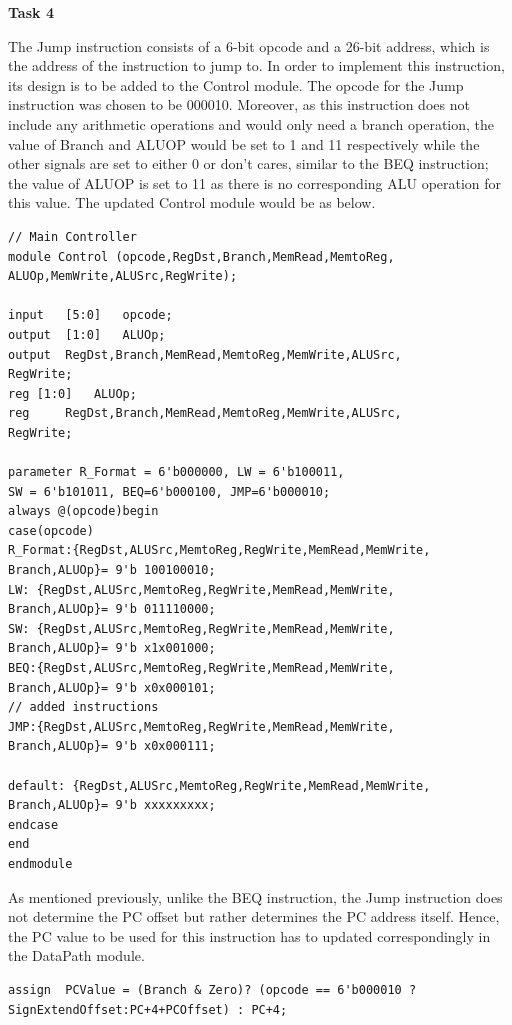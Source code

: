 \documentclass[12pt,a4paper]{article}
\begin{document}
	\vspace{0.4cm}
	\noindent \textbf{\large Task 4}
	\vspace{0.2cm}
	
	\noindent The Jump instruction consists of a 6-bit opcode and a 26-bit address, which is the address of the instruction to jump to. In order to implement this instruction, its design is to be added to the Control module. The opcode for the Jump instruction was chosen to be 000010. Moreover, as this instruction does not include any arithmetic operations and would only need a branch operation, the value of Branch and ALUOP would be set to 1 and 11 respectively while the other signals are set to either 0 or don't cares, similar to the BEQ instruction; the value of ALUOP is set to 11 as there is no corresponding ALU operation for this value. The updated Control module would be as below. 
	
	\vspace{-0.4cm}
	\begin{lstlisting}[style={verilog-style}]
// Main Controller
module Control (opcode,RegDst,Branch,MemRead,MemtoReg,
ALUOp,MemWrite,ALUSrc,RegWrite);

input 	[5:0] 	opcode;
output	[1:0] 	ALUOp;
output	RegDst,Branch,MemRead,MemtoReg,MemWrite,ALUSrc,
RegWrite;
reg	[1:0]	ALUOp;
reg 	RegDst,Branch,MemRead,MemtoReg,MemWrite,ALUSrc,
RegWrite;

parameter R_Format = 6'b000000, LW = 6'b100011, 
SW = 6'b101011, BEQ=6'b000100, JMP=6'b000010;
always @(opcode)begin
case(opcode)
R_Format:{RegDst,ALUSrc,MemtoReg,RegWrite,MemRead,MemWrite,
Branch,ALUOp}= 9'b 100100010;
LW: {RegDst,ALUSrc,MemtoReg,RegWrite,MemRead,MemWrite,
Branch,ALUOp}= 9'b 011110000; 
SW: {RegDst,ALUSrc,MemtoReg,RegWrite,MemRead,MemWrite,
Branch,ALUOp}= 9'b x1x001000;	
BEQ:{RegDst,ALUSrc,MemtoReg,RegWrite,MemRead,MemWrite,
Branch,ALUOp}= 9'b x0x000101; 
// added instructions
JMP:{RegDst,ALUSrc,MemtoReg,RegWrite,MemRead,MemWrite,
Branch,ALUOp}= 9'b x0x000111;

default: {RegDst,ALUSrc,MemtoReg,RegWrite,MemRead,MemWrite,
Branch,ALUOp}= 9'b xxxxxxxxx;
endcase
end
endmodule 
	\end{lstlisting}
	
	\noindent As mentioned previously, unlike the BEQ instruction, the Jump instruction does not determine the PC offset but rather determines the PC address itself. Hence, the PC value to be used for this instruction has to updated correspondingly in the DataPath module.
	
	\begin{lstlisting}[style={verilog-style}]
assign	PCValue	= (Branch & Zero)? (opcode == 6'b000010 ? 
SignExtendOffset:PC+4+PCOffset) : PC+4;
\end{lstlisting}
	
\end{document}
